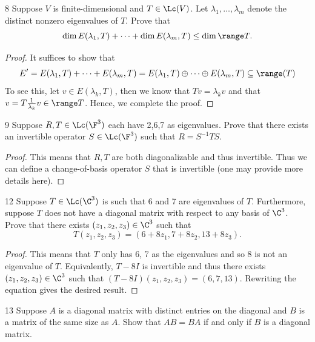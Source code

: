 \documentclass{extarticle}
\begin{document}
\begin{problem}{8}
    Suppose \(V\) is finite-dimensional and \(T \in \Lc(V)\). Let \(\lambda_1, \ldots, \lambda_m\) denote 
    the distinct nonzero eigenvalues of \(T\). Prove that 
    \[\dim E(\lambda_1, T) + \cdots + \dim E(\lambda_m, T) \leq \dim \range T.\]
\end{problem}

\begin{proof}
It suffices to show that 
\[E' = E(\lambda_1, T) + \cdots + E(\lambda_m, T) = E(\lambda_1, T) \oplus \cdots \oplus E(\lambda_m, T) 
\subseteq \range (T)\]
To see this, let \(v \in E(\lambda_k, T)\), then we know that \(Tv = \lambda_k v\) and that 
\(v = T \frac{1}{\lambda_k}v  \in \range T\). Hence, we complete the proof. 
\end{proof}

\begin{problem}{9}
    Suppose \(R, T \in \Lc(\F^3)\) each have 2,6,7 as eigenvalues. Prove that there exists an invertible 
    operator \(S \in \Lc(\F^3)\) such that \(R = S^{-1}TS\).
\end{problem}

\begin{proof}
This means that \(R, T\) are both diagonalizable and thus invertible. Thus we can define a change-of-basis 
operator \(S\) that is invertible (one may provide more details here).
\end{proof}

\begin{problem}{12}
    Suppose \(T \in \Lc(\C^3)\) is such that 6 and 7 are eigenvalues of \(T\). Furthermore, suppose \(T\) 
    does not have a diagonal matrix with respect to any basis of \(\C^3\). Prove that there exists 
    \((z_1, z_2, z_3) \in \C^3\) such that 
    \[T(z_1, z_2, z_3) = (6 + 8 z_1, 7 + 8z_2, 13 + 8 z_3).\]
\end{problem}

\begin{proof}
This means that \(T\) only has 6, 7 as the eigenvalues and so 8 is not an eigenvalue of \(T\). Equivalently, 
\(T - 8I\) is invertible and thus there exists \((z_1, z_2, z_3) \in \C^3\) such that \((T - 8I) 
(z_1, z_2, z_3) = (6, 7, 13)\). Rewriting the equation gives the desired result. 
\end{proof}

\begin{problem}{13}
    Suppose \(A\) is a diagonal matrix with distinct entries on the diagonal and \(B\) is a matrix of the same 
    size as \(A\). Show that \(AB = BA\) if and only if \(B\) is a diagonal matrix. 
\end{problem}
\end{document}
